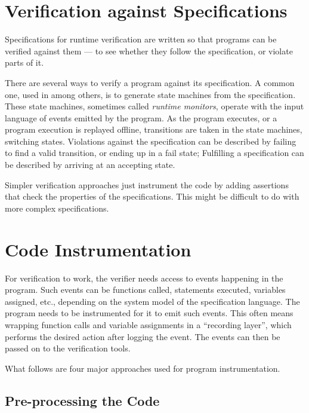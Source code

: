 \documentclass[a4paper,11pt]{kth-mag}
\begin{document}
\section{Verification against Specifications} \label{section-verification}

Specifications for runtime verification are written so that programs can be
verified against them --- to see whether they follow the specification, or
violate parts of it.

There are several ways to verify a program against its specification. A common
one, used in \cite{bauer06monitoring, bodden05efficientrv, jalili07rverl,
barringer03eagle} among others, is to generate state machines from the
specification. These state machines, sometimes called \textit{runtime
monitors}, operate with the input language of events emitted by the program. As
the program executes, or a program execution is replayed offline, transitions
are taken in the state machines, switching states. Violations against the
specification can be described by failing to find a valid transition, or ending
up in a fail state; Fulfilling a specification can be described by arriving at
an accepting state.

Simpler verification approaches just instrument the code by adding assertions
that check the properties of the specifications. This might be difficult to do
with more complex specifications.


\section{Code Instrumentation} \label{section-instrumentation}

For verification to work, the verifier needs access to events happening in the
program. Such events can be functions called, statements executed, variables
assigned, etc., depending on the system model of the specification language.
The program needs to be instrumented for it to emit such events. This often
means wrapping function calls and variable assignments in a ``recording
layer'', which performs the desired action after logging the event. The events
can then be passed on to the verification tools.

What follows are four major approaches used for program instrumentation.


\subsection{Pre-processing the Code}
\end{document}
